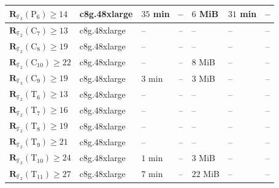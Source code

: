 \documentclass[11pt]{article}
\theoremstyle{definition}
\newcommand{\F}{\mathbb{F}}
\newcommand{\Rk}[2]{\mathbf{R}_{#1}(#2)}
\newcommand{\Cyct}[1]{\mathrm{C}_{#1}}
\newcommand{\Fullt}[1]{\mathrm{P}_{#1}}
\newcommand{\Trunct}[1]{\mathrm{T}_{#1}}
\begin{document}
\begin{table}[!ht]
\begin{tabular}{lllcllc}
    $\Rk{\F_3}{\Fullt{6}}\ge 14$              & c8g.48xlarge             & $35$ min                  & --                        & $6$ MiB                  & $31$ min                  & --                        \\
    \midrule
    $\Rk{\F_2}{\Cyct{7}}\ge 13$               & c8g.48xlarge             & --                        & --                        & --                       & --                        & --                        \\
    $\Rk{\F_2}{\Cyct{8}}\ge 19$               & c8g.48xlarge             & --                        & --                        & --                       & --                        & --                        \\
    $\Rk{\F_2}{\Cyct{10}}\ge 22$              & c8g.48xlarge             & --                        & --                        & $8$ MiB                  & --                        & --                        \\
    $\Rk{\F_3}{\Cyct{9}}\ge 19$               & c8g.48xlarge             & $3$ min                   & --                        & $3$ MiB                  & --                        & --                        \\
    \midrule
    $\Rk{\F_2}{\Trunct{6}}\ge 13$             & c8g.48xlarge             & --                        & --                        & --                       & --                        & --                        \\
    $\Rk{\F_2}{\Trunct{7}}\ge 16$             & c8g.48xlarge             & --                        & --                        & --                       & --                        & --                        \\
    $\Rk{\F_2}{\Trunct{8}}\ge 19$             & c8g.48xlarge             & --                        & --                        & --                       & --                        & --                        \\
    $\Rk{\F_2}{\Trunct{9}}\ge 21$             & c8g.48xlarge             & --                        & --                        & --                       & --                        & --                        \\
    $\Rk{\F_2}{\Trunct{10}}\ge 24$            & c8g.48xlarge             & $1$ min                   & --                        & $3$ MiB                  & --                        & --                        \\
    $\Rk{\F_2}{\Trunct{11}}\ge 27$            & c8g.48xlarge             & $7$ min                   & --                        & $22$ MiB                 & --                        & --                        \\

\end{tabular}
\end{table}
\end{document}
